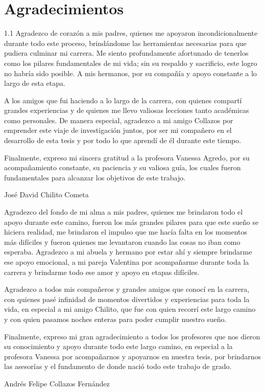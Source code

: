 \documentclass[12pt,letterpaper,oneside]{report}
\begin{document}
\chapter*{Agradecimientos}
\thispagestyle{plain}
\enlargethispage{\baselineskip}
\begin{spacing}{1.1}
Agradezco de corazón a mis padres, quienes me apoyaron incondicionalmente
durante todo este proceso, brindándome las herramientas necesarias para que
pudiera culminar mi carrera. Me siento profundamente afortunado de tenerlos como
los pilares fundamentales de mi vida; sin su respaldo y sacrificio, este logro no
habría sido posible. A mis hermanos, por su compañía y apoyo constante a lo largo
de esta etapa.

A los amigos que fui haciendo a lo largo de la carrera, con quienes compartí
grandes experiencias y de quienes me llevo valiosas lecciones tanto académicas
como personales. De manera especial, agradezco a mi amigo Collazos por emprender
este viaje de investigación juntos, por ser mi compañero en el desarrollo de esta
tesis y por todo lo que aprendí de él durante este tiempo.

Finalmente, expreso mi sincera gratitud a la profesora Vanessa Agredo, por su
acompañamiento constante, su paciencia y su valiosa guía, los cuales fueron
fundamentales para alcanzar los objetivos de este trabajo.

\smallskip
\noindent José David Chilito Cometa

\medskip
Agradezco del fondo de mi alma a mis padres, quienes me brindaron todo el apoyo
durante este camino, fueron los más grandes pilares para que este sueño se
hiciera realidad, me brindaron el impulso que me hacía falta en los momentos más
difíciles y fueron quienes me levantaron cuando las cosas no iban como esperaba.
Agradezco a mi abuela y hermano por estar ahí y siempre brindarme ese apoyo
emocional, a mi pareja Valentina por acompañarme durante toda la carrera y
brindarme todo ese amor y apoyo en etapas difíciles.

Agradezco a todos mis compañeros y grandes amigos que conocí en la carrera, con
quienes pasé infinidad de momentos divertidos y experiencias para toda la vida,
en especial a mi amigo Chilito, que fue con quien recorrí este largo camino y con
quien pasamos noches enteras para poder cumplir nuestro sueño.

Finalmente, expreso mi gran agradecimiento a todos los profesores que nos dieron
su conocimiento y apoyo durante todo este largo camino, en especial a la
profesora Vanessa por acompañarnos y apoyarnos en nuestra tesis, por brindarnos
las asesorías y el fundamento de donde nació todo este trabajo de grado.

\smallskip
\noindent Andrés Felipe Collazos Fernández
\end{spacing}
\end{document}
